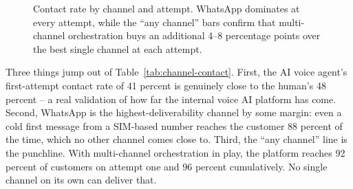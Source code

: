 \begin{figure}[H]
\centering
{}
\caption{Contact rate by channel and attempt. WhatsApp dominates at every attempt, while the ``any channel'' bars confirm that multi-channel orchestration buys an additional 4--8 percentage points over the best single channel at each attempt.}
\label{fig:channel-bars}
\end{figure}

Three things jump out of Table~\ref{tab:channel-contact}. First, the AI voice agent's first-attempt contact rate of 41 percent is genuinely close to the human's 48 percent -- a real validation of how far the internal voice AI platform has come. Second, WhatsApp is the highest-deliverability channel by some margin: even a cold first message from a SIM-based number reaches the customer 88 percent of the time, which no other channel comes close to. Third, the ``any channel'' line is the punchline. With multi-channel orchestration in play, the platform reaches 92 percent of customers on attempt one and 96 percent cumulatively. No single channel on its own can deliver that.

